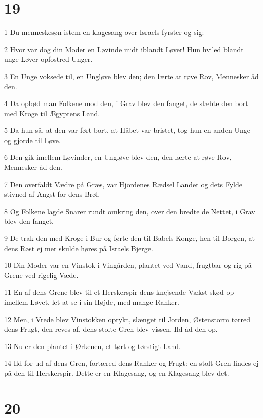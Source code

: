 \chapter{19}

\par 1 Du menneskesøn istem en klagesang over Israels fyrster og sig:
\par 2 Hvor var dog din Moder en Løvinde midt iblandt Løver! Hun hviled blandt unge Løver opfostred Unger.
\par 3 En Unge voksede til, en Ungløve blev den; den lærte at røve Rov, Mennesker åd den.
\par 4 Da opbød man Folkene mod den, i Grav blev den fanget, de slæbte den bort med Kroge til Ægyptens Land.
\par 5 Da hun så, at den var ført bort, at Håbet var bristet, tog hun en anden Unge og gjorde til Løve.
\par 6 Den gik imellem Løvinder, en Ungløve blev den, den lærte at røve Rov, Mennesker åd den.
\par 7 Den overfaldt Vædre på Græs, var Hjordenes Rædsel Landet og dets Fylde stivned af Angst for dens Brøl.
\par 8 Og Folkene lagde Snarer rundt omkring den, over den bredte de Nettet, i Grav blev den fanget.
\par 9 De trak den med Kroge i Bur og førte den til Babels Konge, hen til Borgen, at dens Røst ej mer skulde høres på Israels Bjerge.
\par 10 Din Moder var en Vinstok i Vingården, plantet ved Vand, frugtbar og rig på Grene ved rigelig Væde.
\par 11 En af dens Grene blev til et Herskerspir dens knejsende Vækst skød op imellem Løvet, let at se i sin Højde, med mange Ranker.
\par 12 Men, i Vrede blev Vinstokken oprykt, slænget til Jorden, Østenstorm tørred dens Frugt, den reves af, dens stolte Gren blev vissen, Ild åd den op.
\par 13 Nu er den plantet i Ørkenen, et tørt og tørstigt Land.
\par 14 Ild for ud af dens Gren, fortæred dens Ranker og Frugt: en stolt Gren findes ej på den til Herskerspir. Dette er en Klagesang, og en Klagesang blev det.

\chapter{20}

